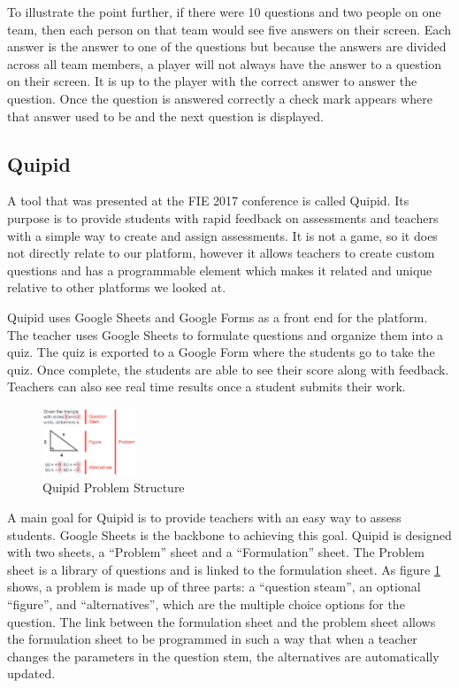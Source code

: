 \documentclass{article}
\begin{document}
        To illustrate the point further, if there were 10 questions and two people on one team, then each person on that team would see five answers on their screen. Each answer is the answer to one of the questions but because the answers are divided across all team members, a player will not always have the answer to a question on their screen. It is up to the player with the correct answer to answer the question. Once the question is answered correctly a check mark appears where that answer used to be and the next question is displayed.
    
    \subsection{Quipid}
        A tool that was presented at the FIE 2017 conference is called Quipid. Its purpose is to provide students with rapid feedback on assessments and teachers with a simple way to create and assign assessments. It is not a game, so it does not directly relate to our platform, however it allows teachers to create custom questions and has a programmable element which makes it related and unique relative to other platforms we looked at.
        \smallskip
        
        Quipid uses Google Sheets and Google Forms as a front end for the platform. The teacher uses Google Sheets to formulate questions and organize them into a quiz. The quiz is exported to a Google Form where the students go to take the quiz. Once complete, the students are able to see their score along with feedback. Teachers can also see real time results once a student submits their work.
        \smallskip
        \begin{figure}
            \centering
            \includegraphics[width=0.25\textwidth]{images/quipid-problem.png}
            \caption{Quipid Problem Structure \cite{quipid}}
            \label{fig:quipid-problem}
        \end{figure}
        \indent A main goal for Quipid is to provide teachers with an easy way to assess students. Google Sheets is the backbone to achieving this goal. Quipid is designed with two sheets, a ``Problem'' sheet and a ``Formulation'' sheet. The Problem sheet is a library of questions and is linked to the formulation sheet. As figure \ref{fig:quipid-problem} shows, a problem is made up of three parts: a ``question steam'', an optional ``figure'', and ``alternatives'', which are the multiple choice options for the question. The link between the formulation sheet and the problem sheet allows the formulation sheet to be programmed in such a way that when a teacher changes the parameters in the question stem, the alternatives are automatically updated.
        \smallskip
        
\end{document}
